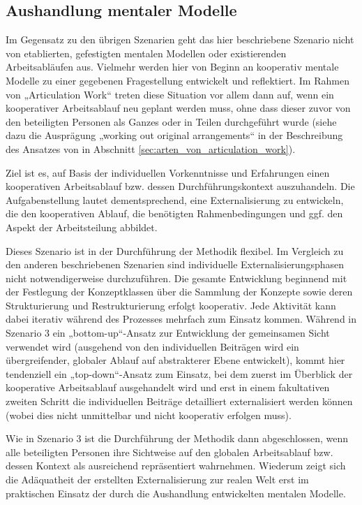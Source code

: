 
\subsection{Aushandlung mentaler Modelle} %
\label{sub:aushandlung_individueller_mentaler_modelle}

Im Gegensatz zu den übrigen Szenarien geht das hier beschriebene Szenario nicht von etablierten, gefestigten mentalen Modellen oder existierenden Arbeitsabläufen aus. Vielmehr werden hier von Beginn an kooperativ mentale Modelle zu einer gegebenen Fragestellung entwickelt und reflektiert. Im Rahmen von „Articulation Work“ treten diese Situation vor allem dann auf, wenn ein kooperativer Arbeitsablauf neu geplant werden muss, ohne dass dieser zuvor von den beteiligten Personen als Ganzes oder in Teilen durchgeführt wurde (siehe dazu die Ausprägung „working out original arrangements“ in der Beschreibung des Ansatzes von \citet{Corbin93} in Abschnitt \ref{sec:arten_von_articulation_work}). 

Ziel ist es, auf Basis der individuellen Vorkenntnisse und Erfahrungen einen kooperativen Arbeitsablauf bzw. dessen Durchführungskontext auszuhandeln. Die Aufgabenstellung lautet dementsprechend, eine Externalisierung zu entwickeln, die den kooperativen Ablauf, die benötigten Rahmenbedingungen und ggf. den Aspekt der Arbeitsteilung abbildet. 

Dieses Szenario ist in der Durchführung der Methodik flexibel. Im Vergleich zu den anderen beschriebenen Szenarien sind individuelle Externalisierungsphasen nicht notwendigerweise durchzuführen. Die gesamte Entwicklung beginnend mit der Festlegung der Konzeptklassen über die Sammlung der Konzepte sowie deren Strukturierung und Restrukturierung erfolgt kooperativ. Jede Aktivität kann dabei iterativ während des Prozesses mehrfach zum Einsatz kommen. Während in Szenario 3 ein „bottom-up“-Ansatz zur Entwicklung der gemeinsamen Sicht verwendet wird (ausgehend von den individuellen Beiträgen wird ein übergreifender, globaler Ablauf auf abstrakterer Ebene entwickelt), kommt hier tendenziell ein „top-down“-Ansatz zum Einsatz, bei dem zuerst im Überblick der kooperative Arbeitsablauf ausgehandelt wird und erst in einem fakultativen zweiten Schritt die individuellen Beiträge detailliert externalisiert werden können (wobei dies nicht unmittelbar und nicht kooperativ erfolgen muss).

Wie in Szenario 3 ist die Durchführung der Methodik dann abgeschlossen, wenn alle beteiligten Personen ihre Sichtweise auf den globalen Arbeitsablauf bzw. dessen Kontext als ausreichend repräsentiert wahrnehmen. Wiederum zeigt sich die Adäquatheit der erstellten Externalisierung zur realen Welt erst im praktischen Einsatz der durch die Aushandlung entwickelten mentalen Modelle. 

